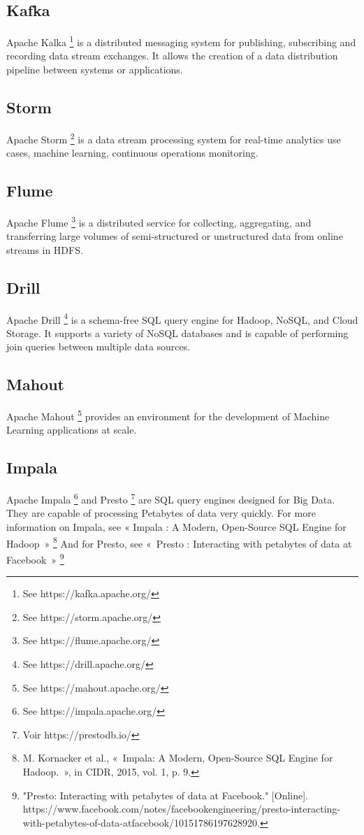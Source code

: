 \documentclass[12pt,english]{book}
\begin{document}
\subsection{Kafka}

Apache Kalka \footnote{See https://kafka.apache.org/} is a distributed messaging system for publishing, subscribing and recording data stream exchanges.
It allows the creation of a data distribution pipeline between systems or applications. 

\subsection{Storm}

Apache Storm \footnote{See https://storm.apache.org/} is a data stream processing system for real-time analytics use cases, machine learning, continuous operations monitoring.

\subsection{Flume}

Apache Flume \footnote{See https://flume.apache.org/} is a distributed service for collecting, aggregating, and transferring large volumes of semi-structured or unstructured data from online streams in HDFS.

\subsection{Drill}

Apache Drill \footnote{See https://drill.apache.org/} is a schema-free SQL query engine for Hadoop, NoSQL, and Cloud Storage.
It supports a variety of NoSQL databases and is capable of performing join queries between multiple data sources.   

\subsection{Mahout}

Apache Mahout \footnote{See https://mahout.apache.org/} provides an environment for the development of Machine Learning applications at scale.

\subsection{Impala}

Apache Impala \footnote{See https://impala.apache.org/} and Presto \footnote{Voir https://prestodb.io/} are SQL query engines designed for Big Data.
They are capable of processing Petabytes of data very quickly. 
For more information on Impala, see « Impala : A Modern, Open-Source SQL Engine for Hadoop » \footnote{M. Kornacker et al., « Impala: A Modern, Open-Source SQL Engine for Hadoop. », in CIDR, 2015, vol. 1, p. 9.}
And for Presto, see « Presto : Interacting with petabytes of data at Facebook » \footnote{"Presto: Interacting with petabytes of data at Facebook." [Online]. https://www.facebook.com/notes/facebookengineering/presto-interacting-with-petabytes-of-data-atfacebook/10151786197628920.}
\end{document}
